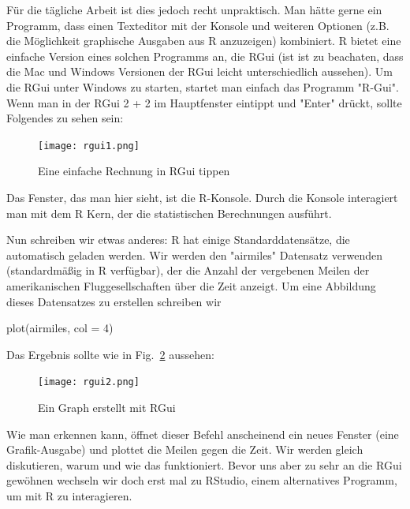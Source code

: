 \documentclass[a4paper,twoside]{tufte-book}\usepackage[]{graphicx}\usepackage[]{color}
\begin{document}
\begin{appendices}
Für die tägliche Arbeit ist dies jedoch recht unpraktisch. Man hätte gerne ein Programm, dass einen Texteditor mit der Konsole und weiteren Optionen (z.B. die Möglichkeit graphische Ausgaben aus R anzuzeigen) kombiniert. R bietet eine einfache Version eines solchen Programms an, die RGui (ist ist zu beachaten, dass die Mac und Windows Versionen der RGui leicht unterschiedlich aussehen).  Um die RGui unter Windows zu starten, startet man einfach das Programm "R-Gui". Wenn man in der RGui 2 + 2 im Hauptfenster eintippt und "Enter" drückt, sollte Folgendes zu sehen sein:

\begin{figure}[]
\begin{center}
\texttt{[image: rgui1.png]}
\caption{Eine einfache Rechnung in RGui tippen}
\label{fig: Rgui1}
\end{center}
\end{figure}

Das Fenster, das man hier sieht, ist die R-Konsole. Durch die Konsole interagiert man mit dem R Kern, der die statistischen Berechnungen ausführt.

Nun schreiben wir etwas anderes: R hat einige Standarddatensätze, die automatisch geladen werden. Wir werden den "airmiles" Datensatz verwenden (standardmäßig in R verfügbar), der die Anzahl der vergebenen Meilen der amerikanischen Fluggesellschaften über die Zeit anzeigt. Um eine Abbildung dieses Datensatzes zu erstellen schreiben wir 

\begin{Schunk}
\begin{Sinput}
plot(airmiles, col = 4)
\end{Sinput}
\end{Schunk}

Das Ergebnis sollte wie in Fig.~\ref{fig: Rgui2} aussehen:

\begin{figure}[]
\begin{center}
\texttt{[image: rgui2.png]}
\caption{Ein Graph erstellt mit RGui}
\label{fig: Rgui2}
\end{center}
\end{figure}

Wie man erkennen kann, öffnet dieser Befehl anscheinend ein neues Fenster (eine Grafik-Ausgabe) und plottet die Meilen gegen die Zeit. Wir werden gleich diskutieren, warum und wie das funktioniert. Bevor uns aber zu sehr an die RGui gewöhnen wechseln wir doch erst mal zu RStudio, einem alternatives Programm, um mit R zu interagieren.


\end{appendices}
\end{document}
